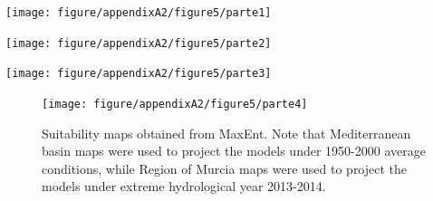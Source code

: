 \documentclass[11pt,twoside]{reedthesis}
\begin{document}
\newpage
\begin{landscape}
\begin{center}\texttt{[image: figure/appendixA2/figure5/parte1]} \end{center}

\begin{center}\texttt{[image: figure/appendixA2/figure5/parte2]} \end{center}

\begin{center}\texttt{[image: figure/appendixA2/figure5/parte3]} \end{center}
\setlength{\textfloatsep}{-10pt plus 1.0pt minus 2.0pt}


\setlength{\abovecaptionskip}{15pt}
\begin{figure}[hbt!]

{\centering \texttt{[image: figure/appendixA2/figure5/parte4]} 

}

\caption[Suitability maps obtained from MaxEnt]{Suitability maps obtained from MaxEnt. Note that Mediterranean basin maps were used to project the models under 1950-2000 average conditions, while Region of Murcia maps were used to project the models under extreme hydrological year 2013-2014.}\label{fig:apa254}
\end{figure}
\setlength{\abovecaptionskip}{0pt}

\newpage
\end{landscape}
\setlength{\abovecaptionskip}{15pt}
\end{document}

